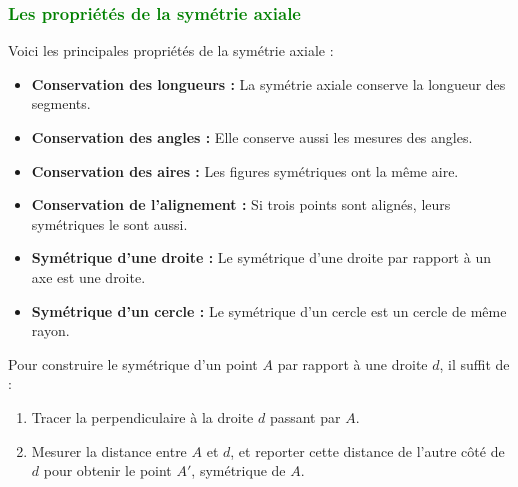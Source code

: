 \documentclass{article}
\begin{document}
\vspace{0.35cm}

\subsubsection{\textcolor{green}{Les propriétés de la symétrie axiale}}

\vspace{0.3cm}

\begin{tcolorbox}[colback=blue!10!white, colframe=red!75!black, title=\textcolor{white}{Propriétés}, sharp corners=south]
    Voici les principales propriétés de la symétrie axiale :
    \begin{itemize}
        \item \textbf{Conservation des longueurs :} La symétrie axiale conserve la longueur des segments.
        \item \textbf{Conservation des angles :} Elle conserve aussi les mesures des angles.
        \item \textbf{Conservation des aires :} Les figures symétriques ont la même aire.
        \item \textbf{Conservation de l'alignement :} Si trois points sont alignés, leurs symétriques le sont aussi.
        \item \textbf{Symétrique d'une droite :} Le symétrique d'une droite par rapport à un axe est une droite.
        \item \textbf{Symétrique d'un cercle :} Le symétrique d'un cercle est un cercle de même rayon.
    \end{itemize}
\end{tcolorbox}

\vspace{0.3cm}

\begin{tcolorbox}[colback=orange!10!white, colframe=orange!75!black, title=\textcolor{white}{Exemple : Symétrie axiale d'un point}, sharp corners=south]
    Pour construire le symétrique d'un point \(A\) par rapport à une droite \(d\), il suffit de :
    \begin{enumerate}
        \item Tracer la perpendiculaire à la droite \(d\) passant par \(A\).
        \item Mesurer la distance entre \(A\) et \(d\), et reporter cette distance de l'autre côté de \(d\) pour obtenir le point \(A'\), symétrique de \(A\).
    \end{enumerate}
\end{tcolorbox}
\end{document}
